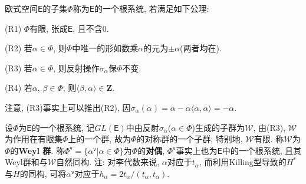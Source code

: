 \documentclass{ctexart}%
\theoremstyle{definition}
\theoremstyle{remark}
\begin{document}
欧式空间$\mathsf{E}$的子集$\Phi$称为$\mathsf{E}$的一个根系统, 若满足如下公理:

(R1) $\Phi$有限, 张成$\mathsf{E}$, 且不含$0$.

(R2) 若$\alpha \in \Phi$, 则$\Phi$中唯一的形如数乘$\alpha$的元为$\pm \alpha$(两者均在).

(R3) 若$\alpha \in \Phi$, 则反射操作$\sigma_\alpha$保$\Phi$不变.

(R4) 若$\alpha$, $\beta \in \Phi$, 则$\langle \beta,\alpha\rangle \in \mathbf{Z}$.

注意, (R3)事实上可以推出(R2), 因$\sigma_\alpha(\alpha) = \alpha-\alpha \langle\alpha,\alpha\rangle = -\alpha$.

设$\Phi$为$\mathsf{E}$的一个根系统, 记$GL(\mathsf{E})$中由反射$\sigma_\alpha$($\alpha \in\Phi$)生成的子群为$\mathscr{W}$, 由(R3), $\mathscr{W}$为作用在有限集$\Phi$上的一个群, 故为$\Phi$的对称群的一个子群; 特别地, $\mathscr{W}$有限. 称$\mathscr{W}$为$\Phi$的\textbf{Weyl 群}. 称$\Phi^{\mathsf{v}} = \{\alpha^{\mathsf{v}}|\alpha\in\Phi\}$为$\Phi$的\textbf{对偶}, $\Phi^{\mathsf{v}}$事实上也为$\mathsf{E}$中的一个根系统, 且其Weyl群和与$\mathscr{W}$自然同构. 注: 对李代数来说, $\alpha$对应于$t_\alpha$, 而利用Killing型导致的$H^*$与$H$的同构, 可将$\alpha^{\mathsf{v}}$对应于$h_\alpha=2t_\alpha/(t_\alpha,t_\alpha)$. 
\end{document}

